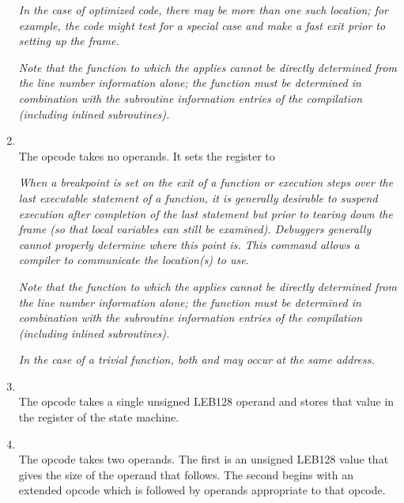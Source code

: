 \begin{enumerate}[1. ]
\textit{In the case of optimized code, there may be more than one such
location; for example, the code might test for a special case
and make a fast exit prior to setting up the frame.}

\textit{Note that the function to which the 
 applies cannot
be directly determined from the line number information alone;
\bb
the function
\eb
must be determined in combination with the subroutine
information entries of the compilation (including inlined
subroutines).}

\item \textbf{\DWLNSsetepiloguebeginTARG} \\
The \DWLNSsetepiloguebeginNAME{} opcode takes no operands. It
sets the  register to 

\textit{When a breakpoint is set on the exit of a function or execution
steps over the last executable statement of a function, it is
generally desirable to suspend execution after completion of
the last statement but prior to tearing down the frame (so that
local variables can still be examined). Debuggers generally
cannot properly determine where this point is. This command
allows a compiler to communicate the location(s) to use.}

\textit{Note that the function to which the 
 applies cannot
be directly determined from the line number information alone;
\bb
the function
\eb
must be determined in combination with the subroutine
information entries of the compilation (including inlined
subroutines).}

\textit{In the case of a trivial function, both 
 and
 may occur at the same address.}

\item \textbf{\DWLNSsetisaTARG} \\
The \DWLNSsetisaNAME{} opcode takes a single
unsigned LEB128 operand and stores that value in the 
register of the state machine.

\item \textbf{\DWLNSextendedopTARG} \\
\bb
The \DWLNSextendedopNAME{} opcode takes two operands. The first is an
unsigned LEB128 value that gives the size of the operand that follows.
The second begins with an extended opcode which is followed by
operands appropriate to that opcode.
\eb

\end{enumerate}

